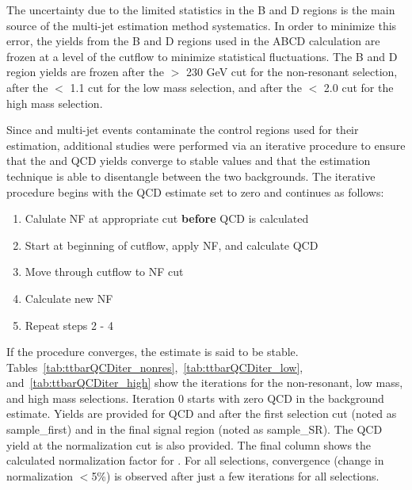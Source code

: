 The uncertainty due to the limited statistics in the B and D regions is the main source of the multi-jet estimation method systematics. In order to minimize this error, the yields from the  B and D regions used in the ABCD calculation are frozen at a level of the cutflow to minimize statistical fluctuations. The B and D region yields are frozen after the \ptbb $>$ 230 GeV cut for the non-resonant selection, after the \drbb $<$ 1.1 cut for the low mass selection, and after the \drww $<$ 2.0 cut for the high mass selection. %

Since \ttbar and  multi-jet events contaminate the control regions used for their estimation, additional studies were performed via an iterative procedure to ensure that the \ttbar and QCD yields converge to stable values and that the estimation technique is able to disentangle between the two backgrounds. The iterative procedure begins with the QCD estimate set to zero and continues as follows:
\begin{enumerate}
\item Calulate \ttbar NF at appropriate cut \textbf{before} QCD is calculated
\item Start at beginning of cutflow, apply \ttbar NF, and calculate QCD
\item Move through cutflow to \ttbar NF cut
\item Calculate new \ttbar NF
\item Repeat steps 2 - 4
\end{enumerate}
If the procedure converges, the estimate is said to be stable. Tables~\ref{tab:ttbarQCDiter_nonres},~\ref{tab:ttbarQCDiter_low}, and~\ref{tab:ttbarQCDiter_high} show the iterations for the non-resonant, low mass, and high mass selections. Iteration 0 starts with zero QCD in the background estimate. Yields are provided for QCD and \ttbar after the first selection cut (noted as sample\_first) and in the final \mbb signal region (noted as sample\_SR). The QCD yield at the \ttbar normalization cut is also provided. The final column shows the calculated normalization factor for \ttbar. For all selections, convergence (change in \ttbar normalization $<$5\%) is observed after just a few iterations for all selections. 
